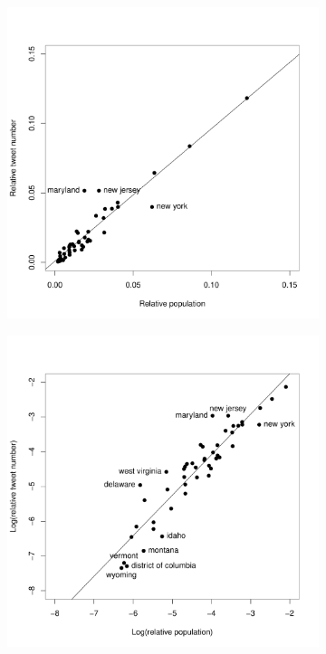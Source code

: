 \documentclass[11pt, a4paper,twoside]{report}\usepackage[]{graphicx}\usepackage[]{color}
\begin{document}
\begin{figure}[H]
\centering
 \begin{subfigure}[t]{0.6\textwidth}
  \includegraphics[width=1\linewidth]{16_ScatterTweetPop.pdf}
  \caption{}
  \label{fig:tweets_state_full_scatter}
  \end{subfigure}
  
  \begin{subfigure}[t]{0.6\textwidth}
  \includegraphics[width=1\linewidth]{17_ScatterTweetPop_log.pdf}
  \caption{}
  \label{fig:tweets_state_full_scatter_log}
  \end{subfigure}


\end{figure}
\end{document}
